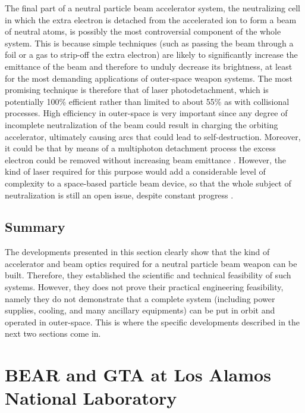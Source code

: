 \documentclass [12pt,a4paper,     ]{report} %
\begin{document}
The final part of a neutral particle beam accelerator system, the neutralizing cell in which the extra electron is detached from the accelerated ion to form a beam of neutral atoms, is possibly the most controversial component of the whole system.  This is because simple techniques (such as passing the beam through a foil or a gas to strip-off the extra electron) are likely to significantly increase the emittance of the beam and therefore to unduly decrease its brightness, at least for the most demanding applications of outer-space weapon systems.  The most promising technique is therefore that of laser photodetachment, which is potentially 100\% efficient rather than limited to about 55\% as with collisional processes.  High efficiency in outer-space is very important since any degree of incomplete neutralization of the beam could result in charging the orbiting accelerator, ultimately causing arcs that could lead to self-destruction.  Moreover, it could be that by means of a multiphoton detachment process the excess electron could be removed without increasing beam emittance \cite{STINT1995-}.  However, the kind of laser required for this purpose would add a considerable level of complexity to a space-based particle beam device, so that the whole subject of neutralization is still an open issue, despite constant progress \cite{ZHAO-1997-,KUAN-1999-}.


\subsection{Summary}

The developments presented in this section clearly show that the kind of accelerator and beam optics required for a neutral particle beam weapon can be built. Therefore, they established the scientific and technical feasibility of such systems.  However, they does not prove their practical engineering feasibility, namely they do not demonstrate that a complete system (including power supplies, cooling, and many ancillary equipments) can be put in orbit and operated in outer-space.  This is where the specific developments described in the next two sections come in.



\section{BEAR and GTA at Los Alamos National Laboratory}
\label{gta:0}
\end{document}
